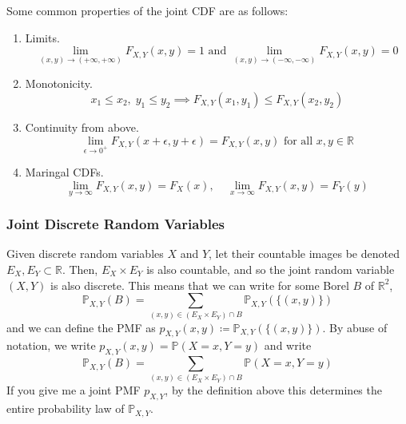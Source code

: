   \begin{lemma}
    Some common properties of the joint CDF are as follows: 
    \begin{enumerate}
      \item Limits. 
      \begin{equation}
        \lim_{(x, y) \rightarrow (+\infty, +\infty)} F_{X, Y} (x, y) = 1 \text{ and } \lim_{(x, y) \rightarrow (-\infty, -\infty)} F_{X, Y} (x, y) = 0
      \end{equation}
      \item Monotonicity. 
      \begin{equation}
        x_1 \leq x_2, \; y_1 \leq y_2 \implies F_{X, Y} (x_1, y_1) \leq F_{X, Y}(x_2, y_2)
      \end{equation}
      \item Continuity from above. 
      \begin{equation}
        \lim_{\epsilon \rightarrow 0^+} F_{X, Y} (x + \epsilon, y + \epsilon) = F_{X, Y} (x, y) \text{ for all } x, y \in \mathbb{R}
      \end{equation}
      \item Maringal CDFs. 
      \begin{equation}
        \lim_{y \rightarrow \infty} F_{X, Y} (x, y) = F_X (x), \;\;\;\; \lim_{x \rightarrow \infty} F_{X, Y} (x, y) = F_Y (y)
      \end{equation}
    \end{enumerate}
  \end{lemma}

  \subsubsection{Joint Discrete Random Variables}

    \begin{definition}
      Given discrete random variables $X$ and $Y$, let their countable images be denoted $E_X, E_Y \subset \mathbb{R}$. Then, $E_X \times E_Y$ is also countable, and so the joint random variable $(X, Y)$ is also discrete. This means that we can write for some Borel $B$ of $\mathbb{R}^2$, 
      \begin{equation}
        \mathbb{P}_{X, Y} (B) = \sum_{(x, y) \in (E_X \times E_Y) \cap B} \mathbb{P}_{X, Y} (\{(x, y)\})
      \end{equation}
      and we can define the PMF as $p_{X, Y} (x, y) \coloneqq \mathbb{P}_{X, Y} (\{(x, y)\})$. By abuse of notation, we write $p_{X, Y} (x, y) = \mathbb{P} (X = x, Y = y)$ and write 
      \begin{equation}
        \mathbb{P}_{X, Y} (B) = \sum_{(x, y) \in (E_X \times E_Y) \cap B} \mathbb{P} (X = x, Y = y)
      \end{equation}
      If you give me a joint PMF $p_{X, Y}$, by the definition above this determines the entire probability law of $\mathbb{P}_{X, Y}$. 
    \end{definition} 

